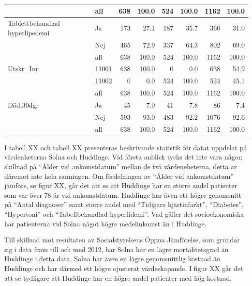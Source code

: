 \begin{table}[htbp]
{\begin{tabular}{ll|rr|rr|rr}
   \hline
 & all & 638 & 100.0 & 524 & 100.0 & 1162 & 100.0 \\ 
   \hline
\hline
Tablettbehandlad hyperlipedemi & Ja & 173 & 27.1 & 187 & 35.7 & 360 & 31.0 \\ 
   & Nej & 465 & 72.9 & 337 & 64.3 & 802 & 69.0 \\ 
   \hline
 & all & 638 & 100.0 & 524 & 100.0 & 1162 & 100.0 \\ 
   \hline
\hline
Utskr\_Inr & 11001 & 638 & 100.0 & 0 & 0.0 & 638 & 54.9 \\ 
   & 11002 & 0 & 0.0 & 524 & 100.0 & 524 & 45.1 \\ 
   \hline
 & all & 638 & 100.0 & 524 & 100.0 & 1162 & 100.0 \\ 
   \hline
\hline
Död.30dgr & Ja & 45 & 7.0 & 41 & 7.8 & 86 & 7.4 \\ 
   & Nej & 593 & 93.0 & 483 & 92.2 & 1076 & 92.6 \\ 
   \hline
 & all & 638 & 100.0 & 524 & 100.0 & 1162 & 100.0 \\ 
   \hline
\hline
\end{tabular}
}

\end{table}









I tabell XX och tabell XX presenteras beskrivande statistik för datat uppdelat på vårdenheterna Solna och Huddinge. Vid första anblick tycks det inte vara någon skillnad på “Ålder vid ankomstdatum” mellan de två vårdeneheterna, detta är däremot inte hela sanningen. Om fördelningen av “Ålder vid ankomstdatum” jämförs, se figur XX, går det att se att Huddinge har en större andel patienter som var över 78 år vid ankomstdatum. Huddinge har även ett högre genomsnitt på “Antal diagnoser” samt större andel med “Tidigare hjärtinfarkt”, “Diabetes”, “Hypertoni” och “Tabellbehandlad hyperlidemi”. Vad gäller det socioekonomiska har patienterna vid Solna något högre medelinkomst än i Huddinge.

Till skillnad mot resultaten av Socialstyrelsens Öppna Jämförelse, som grundar sig i data fram till och med 2012, har Solna här en lägre mortalitetsgrad än Huddinge i detta data. Solna har även en lägre genomsnittlig kostnad än Huddinge och har därmed ett högre ojusterat värdeskapande. I figur XX går det att se tydligare att Huddinge har en högre andel patienter med hög kostnad.

